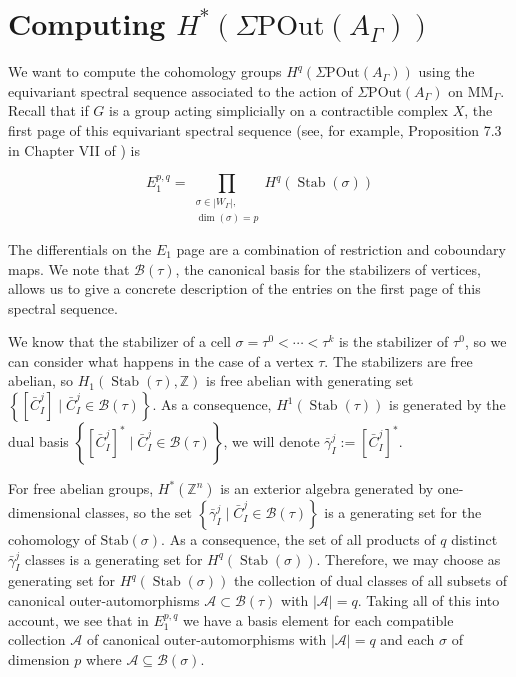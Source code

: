 \documentclass[a4paper]{amsart}
\newcommand{\G}{\Gamma}
\newcommand{\B}{\mathcal{B}}
\newcommand{\au}{\mathcal{A}}
\newcommand{\POut}{\Sigma\mathrm{POut}}
\newcommand{\MM}{\mathrm{MM}}
\newcommand{\Stab}{\mathrm{Stab}}
\theoremstyle{definition}
\theoremstyle{remark}
\begin{document}
\section{Computing $H^*(\POut(A_\G))$}\label{sec:PSO}

We want to compute the cohomology groups $H^q(\POut(A_\G))$ using the equivariant spectral sequence associated to the action of $\POut(A_\G)$ on $ \MM_\G$. Recall that if $G$ is  a group acting simplicially on a contractible complex $X$, the first page of this equivariant spectral
sequence (see, for example, Proposition 7.3 in  Chapter VII of \cite{Brown}) is

\begin{equation}
    E_1^{p,q}=\prod_{\substack{\sigma \in\left|W_\G\right|, \\ \operatorname{dim}(\sigma)=p}} H^q(\operatorname{Stab}(\sigma))
    \label{eq:spectralSeq}
\end{equation}



The differentials
on the $E_1$ page are a combination of restriction  and coboundary maps. 
We note that $\B(\tau)$,  the canonical basis  for the stabilizers of vertices, allows us to give a concrete description of the entries on the first page of this spectral sequence.



We know that the stabilizer of a cell $\sigma=\tau^0<\cdots<\tau^k$ is the stabilizer of $\tau^0$, so we can consider what happens in the case of a vertex  $\tau$. The stabilizers are free abelian, so  $H_1(\operatorname{Stab}(\tau), \mathbb{Z})$ is free abelian with generating set $\left\{\left[\bar{C}_{I}^j\right] \mid \bar{C}_{I}^j \in \mathcal{B}(\tau)\right\}$. As a consequence, $H^1(\operatorname{Stab}(\tau))$ is generated by the dual basis $\left\{\left[\bar{C}_{I}^j \right]^* \mid \bar{C}_{I}^j \in \mathcal{B}(\tau)\right\}$, we will denote  $\bar{\gamma}_I^j:=\left[\bar{C}_{I}^j\right]^*$.

For free abelian groups,  $H^*(\mathbb{Z}^n)$ is an exterior algebra generated by one-dimensional classes, so the set $\left\{\bar{\gamma}_I^j \mid \bar{C}_{I}^j \in \mathcal{B}(\tau)\right\}$ is a generating set for the cohomology of $\Stab(\sigma)$. As a consequence, the set of all products of $q$ distinct $\bar{\gamma}_I^j$ classes is a generating set for $H^q(\operatorname{Stab}(\sigma))$. Therefore, we may choose as generating set for $H^q(\operatorname{Stab}(\sigma))$  the collection of dual classes of all subsets of canonical outer-automorphisms $\mathcal{A} \subset \mathcal{B}(\tau)$ with $|\mathcal{A}|=q$.
Taking all of this into account, we see that in  $E_1^{p,q}$ we have a basis element for each compatible collection $\au$ of canonical outer-automorphisms with $|\au|=q$ and each $\sigma$ of dimension $p$ where $\mathcal{A}\subseteq\B(\sigma)$.
\end{document}
